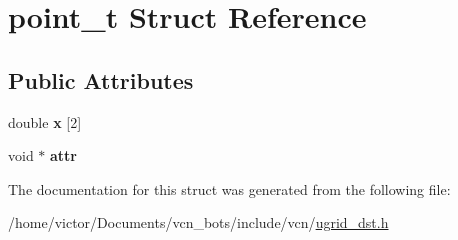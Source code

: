 \hypertarget{structpoint__t}{\section{point\+\_\+t Struct Reference}
\label{structpoint__t}
}
\subsection*{Public Attributes}
\begin{DoxyCompactItemize}
\item 
\hypertarget{structpoint__t_a2c0d79221c58ac6e7cbf048e8ba5c831}{double {\bfseries x} \mbox{[}2\mbox{]}}\label{structpoint__t_a2c0d79221c58ac6e7cbf048e8ba5c831}

\item 
\hypertarget{structpoint__t_a979beaa394658ec89389cd6f10561c2b}{void $\ast$ {\bfseries attr}}\label{structpoint__t_a979beaa394658ec89389cd6f10561c2b}

\end{DoxyCompactItemize}


The documentation for this struct was generated from the following file\+:\begin{DoxyCompactItemize}
\item 
/home/victor/\+Documents/vcn\+\_\+bots/include/vcn/\hyperlink{ugrid__dst_8h}{ugrid\+\_\+dst.\+h}\end{DoxyCompactItemize}
